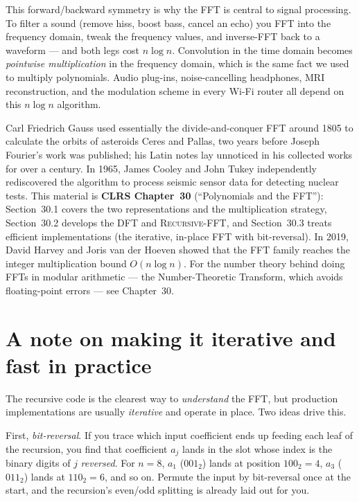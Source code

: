\begin{aestheticbox}
This forward/backward symmetry is why the FFT is central to signal
processing. To filter a sound (remove hiss, boost bass, cancel an echo) you FFT into
the frequency domain, tweak the frequency values, and inverse-FFT back to a waveform
--- and both legs cost $n\log n$. Convolution in the time domain becomes
\emph{pointwise multiplication} in the frequency domain, which is the same fact we
used to multiply polynomials. Audio plug-ins, noise-cancelling headphones, MRI
reconstruction, and the modulation scheme in every Wi-Fi router all depend on
this $n\log n$ algorithm.
\end{aestheticbox}

\begin{historybox}
Carl Friedrich Gauss used essentially the divide-and-conquer FFT around 1805 to calculate the orbits of asteroids Ceres and Pallas, two years before Joseph Fourier's work was published; his Latin notes lay unnoticed in his collected works for over a century. In 1965, James Cooley and John Tukey independently rediscovered the algorithm to process seismic sensor data for detecting nuclear tests. This material is \textbf{CLRS Chapter~30} (``Polynomials and the FFT''): Section~30.1 covers the two representations and the multiplication strategy, Section~30.2 develops the DFT and \textsc{Recursive-FFT}, and Section~30.3 treats efficient implementations (the iterative, in-place FFT with bit-reversal). In 2019, David Harvey and Joris van der Hoeven showed that the FFT family reaches the integer multiplication bound $O(n\log n)$. For the number theory behind doing FFTs in modular arithmetic --- the Number-Theoretic Transform, which avoids floating-point errors --- see Chapter~30.
\end{historybox}

\section{A note on making it iterative and fast in practice}

The recursive code is the clearest way to \emph{understand} the FFT, but production
implementations are usually \emph{iterative} and operate in place. Two ideas drive
this.

First, \emph{bit-reversal}. If you trace which input coefficient ends up feeding each
leaf of the recursion, you find that coefficient $a_j$ lands in the slot whose index
is the binary digits of $j$ \emph{reversed}. For $n=8$, $a_1$ ($001_2$) lands at
position $100_2 = 4$, $a_3$ ($011_2$) lands at $110_2 = 6$, and so on. Permute the
input by bit-reversal once at the start, and the recursion's even/odd splitting is
already laid out for you.

